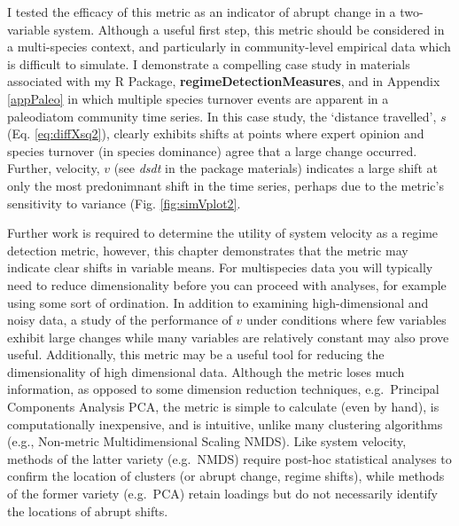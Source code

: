 \documentclass[12pt,twoside,openany]{reedthesis}
\begin{document}
I tested the efficacy of this metric as an indicator of abrupt change in a two-variable system. Although a useful first step, this metric should be considered in a multi-species context, and particularly in community-level empirical data which is difficult to simulate. I demonstrate a compelling case study in materials associated with my R Package, \textbf{regimeDetectionMeasures}, and in Appendix \ref{appPaleo} in which multiple species turnover events are apparent in a paleodiatom community time series. In this case study, the `distance travelled', \(s\) (Eq. \eqref{eq:diffXsq2}), clearly exhibits shifts at points where expert opinion and species turnover (in species dominance) agree that a large change occurred. Further, velocity, \(v\) (see \emph{dsdt} in the package materials) indicates a large shift at only the most predonimnant shift in the time series, perhaps due to the metric's sensitivity to variance (Fig. \ref{fig:simVplot2}.

Further work is required to determine the utility of system velocity as a regime detection metric, however, this chapter demonstrates that the metric may indicate clear shifts in variable means. For multispecies data you will typically need to reduce dimensionality before you can proceed with analyses, for example using some sort of ordination. In addition to examining high-dimensional and noisy data, a study of the performance of \(v\) under conditions where few variables exhibit large changes while many variables are relatively constant may also prove useful. Additionally, this metric may be a useful tool for reducing the dimensionality of high dimensional data. Although the metric loses much information, as opposed to some dimension reduction techniques, e.g.~Principal Components Analysis PCA, the metric is simple to calculate (even by hand), is computationally inexpensive, and is intuitive, unlike many clustering algorithms (e.g., Non-metric Multidimensional Scaling NMDS). Like system velocity, methods of the latter variety (e.g.~NMDS) require post-hoc statistical analyses to confirm the location of clusters (or abrupt change, regime shifts), while methods of the former variety (e.g.~PCA) retain loadings but do not necessarily identify the locations of abrupt shifts.
\end{document}
